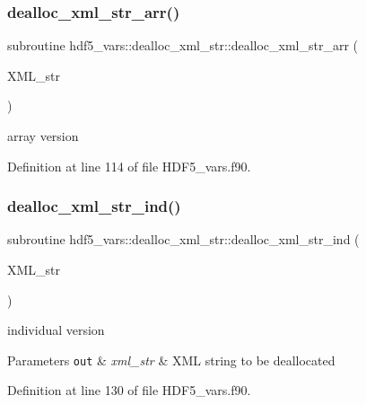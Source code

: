 \subsubsection{\texorpdfstring{dealloc\+\_\+xml\+\_\+str\+\_\+arr()}{dealloc\_xml\_str\_arr()}}
{\footnotesize\ttfamily subroutine hdf5\+\_\+vars\+::dealloc\+\_\+xml\+\_\+str\+::dealloc\+\_\+xml\+\_\+str\+\_\+arr (\begin{DoxyParamCaption}\item[{type(\hyperlink{structhdf5__vars_1_1xml__str__type}{xml\+\_\+str\+\_\+type}), dimension(\+:), intent(inout), allocatable}]{X\+M\+L\+\_\+str }\end{DoxyParamCaption})}



array version 



Definition at line 114 of file H\+D\+F5\+\_\+vars.\+f90.

\mbox{\label{interfacehdf5__vars_1_1dealloc__xml__str_aaff3913b2711c58eaeb3b02a50569213}} 
\subsubsection{\texorpdfstring{dealloc\+\_\+xml\+\_\+str\+\_\+ind()}{dealloc\_xml\_str\_ind()}}
{\footnotesize\ttfamily subroutine hdf5\+\_\+vars\+::dealloc\+\_\+xml\+\_\+str\+::dealloc\+\_\+xml\+\_\+str\+\_\+ind (\begin{DoxyParamCaption}\item[{type(\hyperlink{structhdf5__vars_1_1xml__str__type}{xml\+\_\+str\+\_\+type}), intent(out)}]{X\+M\+L\+\_\+str }\end{DoxyParamCaption})}



individual version 


\begin{DoxyParams}[1]{Parameters}
\mbox{\tt out}  & {\em xml\+\_\+str} & X\+ML string to be deallocated \\
\hline
\end{DoxyParams}


Definition at line 130 of file H\+D\+F5\+\_\+vars.\+f90.



